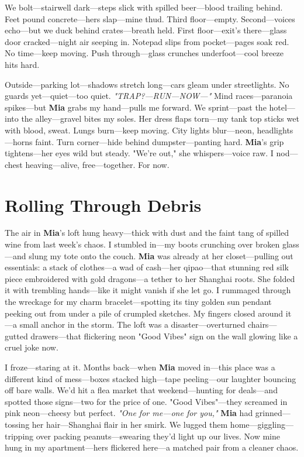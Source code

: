\documentclass{article}
\begin{document}
We bolt—stairwell dark—steps slick with spilled beer—blood trailing behind. Feet pound concrete—hers slap—mine thud. Third floor—empty. Second—voices echo—but we duck behind crates—breath held. First floor—exit’s there—glass door cracked—night air seeping in. Notepad slips from pocket—pages soak red. No time—keep moving. Push through—glass crunches underfoot—cool breeze hits hard.

Outside—parking lot—shadows stretch long—cars gleam under streetlights. No guards yet—quiet—too quiet. \textit{"TRAP?—RUN—NOW—"} Mind races—paranoia spikes—but \textbf{Mia} grabs my hand—pulls me forward. We sprint—past the hotel—into the alley—gravel bites my soles. Her dress flaps torn—my tank top sticks wet with blood, sweat. Lungs burn—keep moving. City lights blur—neon, headlights—horns faint. Turn corner—hide behind dumpster—panting hard. \textbf{Mia}’s grip tightens—her eyes wild but steady. "We’re out," she whispers—voice raw. I nod—chest heaving—alive, free—together. For now.

\section*{Rolling Through Debris}

The air in \textbf{Mia}’s loft hung heavy—thick with dust and the faint tang of spilled wine from last week’s chaos. I stumbled in—my boots crunching over broken glass—and slung my tote onto the couch. \textbf{Mia} was already at her closet—pulling out essentials: a stack of clothes—a wad of cash—her qipao—that stunning red silk piece embroidered with gold dragons—a tether to her Shanghai roots. She folded it with trembling hands—like it might vanish if she let go. I rummaged through the wreckage for my charm bracelet—spotting its tiny golden sun pendant peeking out from under a pile of crumpled sketches. My fingers closed around it—a small anchor in the storm. The loft was a disaster—overturned chairs—gutted drawers—that flickering neon "Good Vibes" sign on the wall glowing like a cruel joke now.

I froze—staring at it. Months back—when \textbf{Mia} moved in—this place was a different kind of mess—boxes stacked high—tape peeling—our laughter bouncing off bare walls. We’d hit a flea market that weekend—hunting for deals—and spotted those signs—two for the price of one. "Good Vibes"—they screamed in pink neon—cheesy but perfect. \textit{"One for me—one for you,"} \textbf{Mia} had grinned—tossing her hair—Shanghai flair in her smirk. We lugged them home—giggling—tripping over packing peanuts—swearing they’d light up our lives. Now mine hung in my apartment—hers flickered here—a matched pair from a cleaner chaos.
\end{document}
